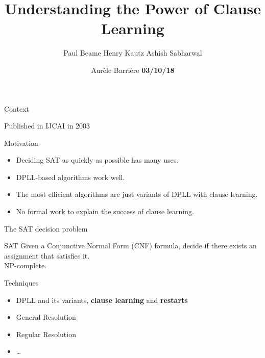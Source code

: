 \documentclass[page number]{beamer}
\def\outline{
  \begin{frame}[plain,noframenumbering]
    \frametitle{Outline}
    \tableofcontents[currentsection]
  \end{frame}
}
\begin{document}
\title[The Power of Clause Learning]{Understanding the Power of Clause Learning}

\author{Paul Beame \hfill Henry Kautz \hfill Ashish Sabharwal}
\vfill
\date{
  \vfill
  Aur\`ele Barri\`ere
  \vfill
  \textbf{03/10/18}}

\def\outline{
  \begin{frame}[plain,noframenumbering]
    \frametitle{Outline}
    \tableofcontents[currentsection]
  \end{frame}
}

\begin{frame}
  \vspace{-2cm}
  \maketitle
  \vspace{-4cm}
\end{frame}



\begin{frame}{Context}
  \begin{block}{Published in IJCAI in 2003}
  \end{block}
  \vfill
  \begin{block}{Motivation}
    \begin{itemize}
    \item Deciding SAT as quickly as possible has many uses.
    \item DPLL-based algorithms work well.
    \item The most efficient algorithms are just variants of DPLL with clause learning.
    \item No formal work to explain the success of clause learning.
    \end{itemize}
  \end{block}
\end{frame}

\begin{frame}{The SAT decision problem}
  \begin{block}{SAT}
    Given a Conjunctive Normal Form (CNF) formula, decide if there exists an assignment that satisfies it. \\
    NP-complete.
  \end{block}
  \vfill
  \begin{exampleblock}{Techniques}
    \begin{itemize}
    \item DPLL and its variants, \textbf{clause learning} and \textbf{restarts}
    \item General Resolution
    \item Regular Resolution
    \item \dots
    \end{itemize}
  \end{exampleblock}
\end{frame}
\end{document}
